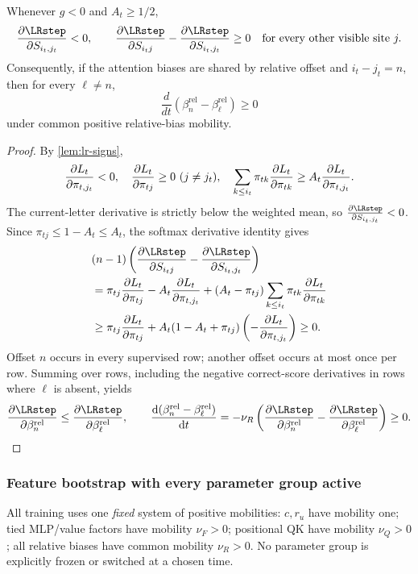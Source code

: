\begin{lrlemma}
\label{lem:lr-postrouting-gradient}
Whenever $g<0$ and $A_t\ge1/2$,
\begin{equation}\label{eq:lr-score-comparison}
 \pd{\LRstep}{S_{i_t,j_t}}<0,\qquad \pd{\LRstep}{S_{i_tj}}-\pd{\LRstep}{S_{i_t,j_t}}\ge0
 \quad\text{for every other visible site }j.
\end{equation}
Consequently, if the attention biases are shared by relative offset and
$i_t-j_t=n$, then for every $\ell\ne n$,
\begin{equation}\label{eq:lr-bias-gap-mono}
 \frac{d}{dt}
 (\beta_n^{\mathrm{rel}}-\beta_\ell^{\mathrm{rel}})\ge0
\end{equation}
under common positive relative-bias mobility.
\end{lrlemma}
\begin{proof}
By \cref{lem:lr-signs},
\[
 \pd{L_t}{\pi_{t,j_t}}<0,\quad
 \pd{L_t}{\pi_{tj}}\ge0\ (j\ne j_t),\quad
 \sum_{k\le i_t}\pi_{tk}\pd{L_t}{\pi_{tk}}
 \ge A_t\pd{L_t}{\pi_{t,j_t}}.
\]
The current-letter derivative is strictly below the weighted mean, so
$\pd{\LRstep}{S_{i_t,j_t}}<0$.
Since $\pi_{tj}\le1-A_t\le A_t$, the softmax derivative identity gives
\begin{align*}
 &(n-1)\left(\pd{\LRstep}{S_{i_tj}}-\pd{\LRstep}{S_{i_t,j_t}}\right)\\
 &=\pi_{tj}\pd{L_t}{\pi_{tj}}-A_t\pd{L_t}{\pi_{t,j_t}}
 +(A_t-\pi_{tj})\sum_{k\le i_t}\pi_{tk}\pd{L_t}{\pi_{tk}}\\
 &\ge\pi_{tj}\pd{L_t}{\pi_{tj}}
 +A_t(1-A_t+\pi_{tj})\left(-\pd{L_t}{\pi_{t,j_t}}\right)\ge0.
\end{align*}
Offset $n$ occurs in every supervised row; another offset occurs at most once
per row. Summing over rows, including the negative correct-score derivatives
in rows where $\ell$ is absent, yields
\[
 \pd{\LRstep}{\beta_n^{\mathrm{rel}}}
 \le\pd{\LRstep}{\beta_\ell^{\mathrm{rel}}},\qquad
 \ddt{(\beta_n^{\mathrm{rel}}-\beta_\ell^{\mathrm{rel}})}
 =-\nu_R\left(\pd{\LRstep}{\beta_n^{\mathrm{rel}}}
 -\pd{\LRstep}{\beta_\ell^{\mathrm{rel}}}\right)\ge0.
\]
\end{proof}

\subsubsection{Feature bootstrap with every parameter group active}
\label{app:weak-routing-bootstrap}

All training uses one \emph{fixed} system of positive mobilities:
$c,r_u$ have mobility one; tied MLP/value factors have mobility
$\nu_F>0$; positional QK have mobility $\nu_Q>0$; all relative biases
have common mobility $\nu_R>0$.
No parameter group is explicitly frozen or switched at a chosen time.

